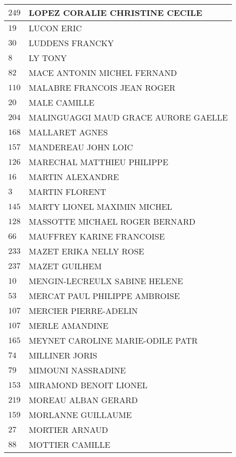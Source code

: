 \begin{xltabular}{\linewidth}{|l|X|}
    \hline
    $249$ & LOPEZ CORALIE CHRISTINE CECILE \\
    \hline
    $19$ & LUCON ERIC \\
    \hline
    $30$ & LUDDENS FRANCKY \\
    \hline
    $8$ & LY TONY \\
    \hline
    $82$ & MACE ANTONIN MICHEL FERNAND \\
    \hline
    $110$ & MALABRE FRANCOIS JEAN ROGER \\
    \hline
    $20$ & MALE CAMILLE \\
    \hline
    $204$ & MALINGUAGGI MAUD GRACE AURORE GAELLE \\
    \hline
    $168$ & MALLARET AGNES \\
    \hline
    $157$ & MANDEREAU JOHN LOIC \\
    \hline
    $126$ & MARECHAL MATTHIEU PHILIPPE \\
    \hline
    $16$ & MARTIN ALEXANDRE \\
    \hline
    $3$ & MARTIN FLORENT \\
    \hline
    $145$ & MARTY LIONEL MAXIMIN MICHEL \\
    \hline
    $128$ & MASSOTTE MICHAEL ROGER BERNARD \\
    \hline
    $66$ & MAUFFREY KARINE FRANCOISE \\
    \hline
    $233$ & MAZET ERIKA NELLY ROSE \\
    \hline
    $237$ & MAZET GUILHEM \\
    \hline
    $10$ & MENGIN-LECREULX SABINE HELENE \\
    \hline
    $53$ & MERCAT PAUL PHILIPPE AMBROISE \\
    \hline
    $107$ & MERCIER PIERRE-ADELIN \\
    \hline
    $107$ & MERLE AMANDINE \\
    \hline
    $165$ & MEYNET CAROLINE MARIE-ODILE PATR \\
    \hline
    $74$ & MILLINER JORIS \\
    \hline
    $79$ & MIMOUNI NASSRADINE \\
    \hline
    $153$ & MIRAMOND BENOIT LIONEL \\
    \hline
    $219$ & MOREAU ALBAN GERARD \\
    \hline
    $159$ & MORLANNE GUILLAUME \\
    \hline
    $27$ & MORTIER ARNAUD \\
    \hline
    $88$ & MOTTIER CAMILLE \\

\end{xltabular}
